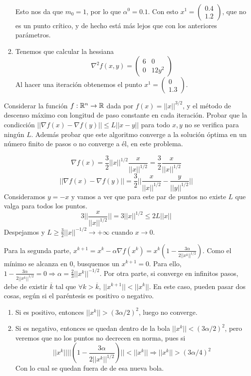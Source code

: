 \documentclass[twoside]{article}
\begin{document}
\begin{solucion}
\begin{enumerate}
\begin{gather*}
\end{gather*}
Esto nos da que $m_0=1$, por lo que $\alpha^0=0.1$. Con esto $x^1=\begin{pmatrix}
0.4\\
1.2
\end{pmatrix}$, que no es un punto crítico, y de hecho está más lejos que con los anteriores parámetros.
\item Tenemos que calcular la hessiana
$$\nabla^2f(x,y)=\begin{pmatrix}
6 & 0\\
0 & 12y^2
\end{pmatrix}$$
Al hacer una iteración obtenemos el punto $x^1=\begin{pmatrix}
0\\
1.3
\end{pmatrix}$.
\end{enumerate}
\end{solucion}

\newpage

\begin{ejercicio}{7}
Considerar la función $f:\mathbb{R}^n\to\mathbb{R}$ dada por $f(x)=||x||^{3/2}$, y el método de descenso máximo con longitud de paso constante en cada iteración. Probar que la condicción $||\nabla f(x)-\nabla f(y)||\leq L||x-y||$ para todo $x,y$ no se verifica para ningún $L$. Además probar que este algoritmo converge a la solución óptima en un número finito de pasos o no converge a él, en este problema.
\end{ejercicio}
\begin{solucion}
$$\nabla f(x)=\frac{3}{2}||x||^{1/2}\frac{x}{||x||^{1/2}}=\frac{3}{2}\frac{x}{||x||^{1/2}}$$
$$||\nabla f(x)-\nabla f(y)||=\frac{3}{2}||\frac{x}{||x||^{1/2}}-\frac{y}{||y||^{1/2}}||$$
Consideramos $y=-x$ y vamos a ver que para este par de puntos no existe $L$ que valga para todos los puntos.
$$3||\frac{x}{||x||^{1/2}}||=3||x||^{1/2}\leq 2L||x||$$
Despejamos y $L\geq\frac{3}{2}||x||^{-1/2}\to +\infty$ cuando $x\to 0$.

Para la segunda parte, $x^{k+1}=x^k-\alpha\nabla f(x^k)=x^k\left(1-\frac{3\alpha}{2||x^k||^{1/2}}\right)$. Como el mínimo se alcanza en 0, busquemos un $x^{k+1}=0$. Para ello, $1-\frac{3\alpha}{2||x^k||^{1/2}}=0\Rightarrow \alpha=\frac{2}{3}||x^k||^{-1/2}$. 
Por otra parte, si converge en infinitos pasos, debe de existir $\overline{k}$ tal que $\forall k>\overline{k}$, $||x^{k+1}||<||x^k||$. En este caso, pueden pasar dos cosas, según si el paréntesis es positivo o negativo.
\begin{enumerate}
\item Si es positivo, entonces $||x^k||>(3\alpha/2)^2$, luego no converge. 
\item Si es negativo, entonces se quedan dentro de la bola $||x^k||<(3\alpha/2)^2$, pero veremos que no los puntos no decrecen en norma, pues si 
$$||x^k||||\left(1-\frac{3\alpha}{2||x^k||^{1/2}}\right)||<||x^k||\Rightarrow ||x^k||>(3\alpha/4)^2$$
Con lo cual se quedan fuera de de esa nueva bola.
\end{enumerate}
\end{solucion}
\end{document}
